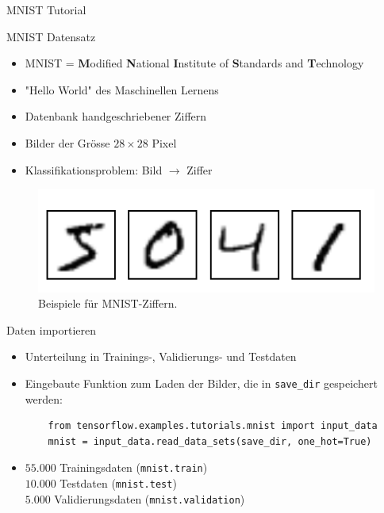 \documentclass[utf8, smaller, c]{beamer}
\begin{document}
\begin{frame}{MNIST Tutorial}
	\begin{block}{MNIST Datensatz}
		\begin{itemize}
			\item MNIST = \textbf{M}odified \textbf{N}ational \textbf{I}nstitute of \textbf{S}tandards and
			\textbf{T}echnology
			\item "Hello World" des Maschinellen Lernens
			\item Datenbank handgeschriebener Ziffern
			\item Bilder der Grösse $28 \times 28$ Pixel
			\item Klassifikationsproblem: Bild $\rightarrow$ Ziffer
		\end{itemize}			
		\begin{figure}[c!]
			\includegraphics[scale=0.3]{pics/mnist_digits}
			\caption{Beispiele für MNIST-Ziffern.}
		\end{figure}				
	\end{block}	 
	
	\framebreak
	
	\begin{block}{Daten importieren}
		\begin{itemize}
			\item Unterteilung in Trainings-, Validierungs- und Testdaten
			\item Eingebaute Funktion zum Laden der Bilder, die in \verb+save_dir+ gespeichert werden:
			\begin{lstlisting}
	from tensorflow.examples.tutorials.mnist import input_data
	mnist = input_data.read_data_sets(save_dir, one_hot=True)
			\end{lstlisting}
			\item $55.000$ Trainingsdaten (\verb+mnist.train+)\\
			      $10.000$ Testdaten (\verb+mnist.test+)\\
			       $5.000$ Validierungsdaten (\verb+mnist.validation+)
		\end{itemize}
		
	\end{block}
	
	\framebreak
	

\end{frame}
\end{document}
